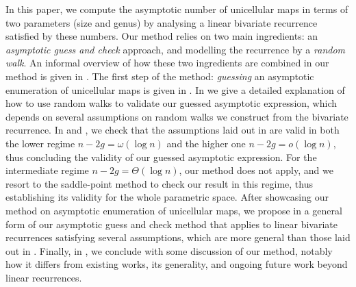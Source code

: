 \documentclass[a4paper,12pt]{article}
\theoremstyle{definition}
\begin{document}
In this paper, we compute the asymptotic number of unicellular maps in terms of two parameters (size and genus) by analysing a linear bivariate recurrence satisfied by these numbers. Our method relies on two main ingredients: an \emph{asymptotic guess and check} approach, and modelling the recurrence by a \emph{random walk}. An informal overview of how these two ingredients are combined in our method is given in . The first step of the method: {\em guessing} an asymptotic enumeration of unicellular maps is given in . In  we give a detailed explanation of how to use random walks to validate our guessed asymptotic expression, which depends on several assumptions on random walks we construct from the bivariate recurrence. In  and , we check that the assumptions laid out in  are valid in both the lower regime $n - 2g = \omega(\log n)$ and the higher one $n - 2g = o(\log n)$, thus concluding the validity of our guessed asymptotic expression. For the intermediate regime $n - 2g = \Theta(\log n)$, our method does not apply, and we resort to the saddle-point method to check our result in this regime, thus establishing its validity for the whole parametric space. After showcasing our method on asymptotic enumeration of unicellular maps, we propose in  a general form of our asymptotic guess and check method that applies to linear bivariate recurrences satisfying several assumptions, which are more general than those laid out in . Finally, in , we conclude with some discussion of our method, notably how it differs from existing works, its generality, and ongoing future work beyond linear recurrences.

\end{document}
